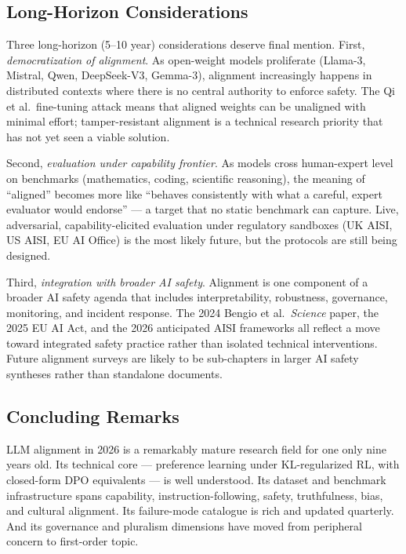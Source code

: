 \documentclass{article}
\begin{document}
\subsection{Long-Horizon Considerations}\label{long-horizon-considerations}

Three long-horizon (5--10 year) considerations deserve final mention. First, \emph{democratization of alignment}. As open-weight models proliferate (Llama-3, Mistral, Qwen, DeepSeek-V3, Gemma-3), alignment increasingly happens in distributed contexts where there is no central authority to enforce safety. The Qi et al.~fine-tuning attack means that aligned weights can be unaligned with minimal effort; tamper-resistant alignment is a technical research priority that has not yet seen a viable solution.

Second, \emph{evaluation under capability frontier}. As models cross human-expert level on benchmarks (mathematics, coding, scientific reasoning), the meaning of ``aligned'' becomes more like ``behaves consistently with what a careful, expert evaluator would endorse'' --- a target that no static benchmark can capture. Live, adversarial, capability-elicited evaluation under regulatory sandboxes (UK AISI, US AISI, EU AI Office) is the most likely future, but the protocols are still being designed.

Third, \emph{integration with broader AI safety}. Alignment is one component of a broader AI safety agenda that includes interpretability, robustness, governance, monitoring, and incident response. The 2024 Bengio et al.~\emph{Science} paper, the 2025 EU AI Act, and the 2026 anticipated AISI frameworks all reflect a move toward integrated safety practice rather than isolated technical interventions. Future alignment surveys are likely to be sub-chapters in larger AI safety syntheses rather than standalone documents.

\subsection{Concluding Remarks}\label{concluding-remarks}

LLM alignment in 2026 is a remarkably mature research field for one only nine years old. Its technical core --- preference learning under KL-regularized RL, with closed-form DPO equivalents --- is well understood. Its dataset and benchmark infrastructure spans capability, instruction-following, safety, truthfulness, bias, and cultural alignment. Its failure-mode catalogue is rich and updated quarterly. And its governance and pluralism dimensions have moved from peripheral concern to first-order topic.
\end{document}
